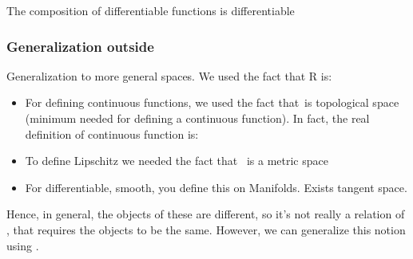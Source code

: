 {    \begin{example}
        The composition of differentiable functions is differentiable
    \end{example}


    \subsubsection{Generalization outside \reals}
    Generalization to more general spaces.
    We used the fact that R is:
    \begin{itemize}
        \item For defining continuous functions, we used the fact that~\reals is topological space (minimum needed for defining a continuous function).
              In fact, the real definition of continuous function is:


        \item To define Lipschitz we needed the fact that~ \reals is a metric space
        \item For differentiable, smooth, you define this on Manifolds.
              Exists tangent space.
    \end{itemize}

    Hence, in general, the objects of these are different, so it's not really a relation of , that requires the objects to be the same.
    However, we can generalize this notion using .

}

